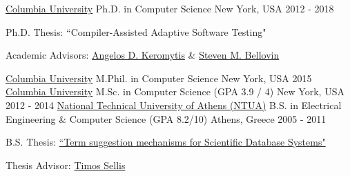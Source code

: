 

\begin{cventries}

  \cventry
    {\href{http://www.cs.columbia.edu/}{Columbia University}}
    {Ph.D. in Computer Science}
    {New York, USA}
    {2012 - 2018}
    {
      \begin{cvitems}
     \item{Ph.D. Thesis: ``Compiler-Assisted Adaptive Software Testing"}
      \item{Academic Advisors: \href{https://www.cs.columbia.edu/~angelos} {Angelos D. Keromytis} \& \href{https://www.cs.columbia.edu/~smb/} {Steven M. Bellovin}}
      \end{cvitems}
    }
  \cventry
    {\href{http://www.cs.columbia.edu/}{Columbia University}}
    {M.Phil. in Computer Science}
    {New York, USA}
    {2015}
    {}
  \cventry
    {\href{http://www.cs.columbia.edu/}{Columbia University}}
    {M.Sc. in Computer Science (GPA 3.9 / 4)}
    {New York, USA}
    {2012 - 2014}
    {}
  \cventry
    {\href{http://www.ece.ntua.gr/}{National Technical University of Athens (NTUA)}}
    {B.S. in Electrical Engineering \& Computer Science (GPA 8.2/10)}
    {Athens, Greece}
    {2005 - 2011}
    {
      \begin{cvitems}
      \item{B.S. Thesis: \href{http://www.dbnet.ece.ntua.gr/pubs/uploads/DIPL-2011-7.pdf}{``Term suggestion mechanisms for Scientific Database Systems"}}
       \item{Thesis Advisor: \href{https://scholar.google.gr/citations?user=G1Iux80AAAAJ} {Timos Sellis}}
      \end{cvitems}
    }

\end{cventries}
